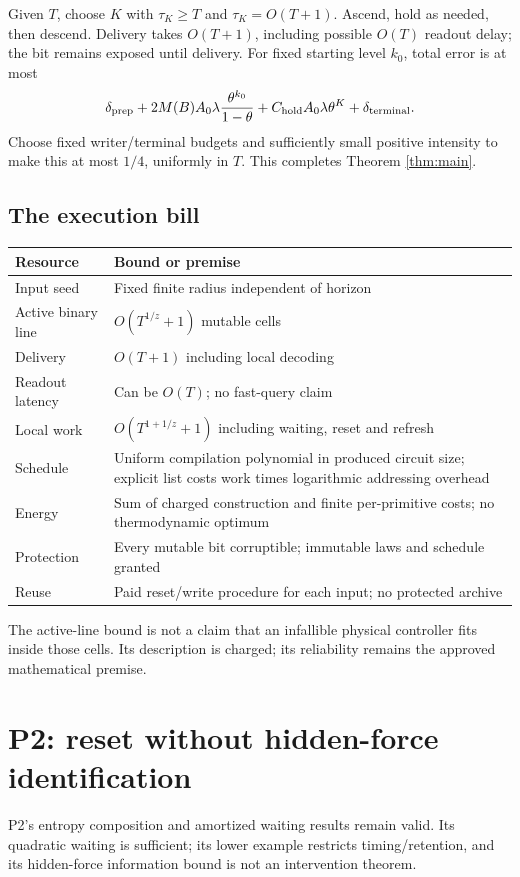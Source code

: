\documentclass[11pt,a4paper]{article}
\begin{document}
Given $T$, choose $K$ with $\tau_K\ge T$ and $\tau_K=O(T+1)$. Ascend, hold as needed, then descend. Delivery takes $O(T+1)$, including possible $O(T)$ readout delay; the bit remains exposed until delivery. For fixed starting level $k_0$, total error is at most
\[
 \delta_{\rm prep}
 +2M(B)A_0\lambda\frac{\theta^{k_0}}{1-\theta}
 +C_{\rm hold}A_0\lambda\theta^K
 +\delta_{\rm terminal}.
\]
Choose fixed writer/terminal budgets and sufficiently small positive intensity to make this at most $1/4$, uniformly in $T$. This completes Theorem \ref{thm:main}.

\subsection{The execution bill}
\begin{center}
\begin{tabularx}{\linewidth}{P{36mm}Y}
\toprule
Resource & Bound or premise\\
\midrule
Input seed & Fixed finite radius independent of horizon\\
Active binary line & $O(T^{1/z}+1)$ mutable cells\\
Delivery & $O(T+1)$ including local decoding\\
Readout latency & Can be $O(T)$; no fast-query claim\\
Local work & $O(T^{1+1/z}+1)$ including waiting, reset and refresh\\
Schedule & Uniform compilation polynomial in produced circuit size; explicit list costs work times logarithmic addressing overhead\\
Energy & Sum of charged construction and finite per-primitive costs; no thermodynamic optimum\\
Protection & Every mutable bit corruptible; immutable laws and schedule granted\\
Reuse & Paid reset/write procedure for each input; no protected archive\\
\bottomrule
\end{tabularx}
\end{center}
The active-line bound is not a claim that an infallible physical controller fits inside those cells. Its description is charged; its reliability remains the approved mathematical premise.

\section{P2: reset without hidden-force identification}
P2's entropy composition and amortized waiting results remain valid. Its quadratic waiting is sufficient; its lower example restricts timing/retention, and its hidden-force information bound is not an intervention theorem.\cite{p2}
\end{document}
